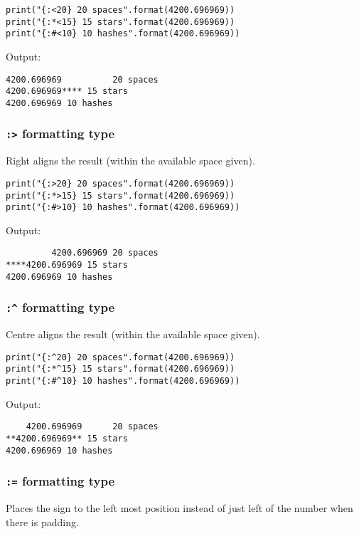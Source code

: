 \documentclass[11pt]{article}
\begin{document}
\begin{verbatim}
print("{:<20} 20 spaces".format(4200.696969))
print("{:*<15} 15 stars".format(4200.696969))
print("{:#<10} 10 hashes".format(4200.696969))
\end{verbatim}

 \noindent Output:

\begin{verbatim}
4200.696969          20 spaces
4200.696969**** 15 stars
4200.696969 10 hashes
\end{verbatim}


\subsubsection{\texttt{:>} formatting type}
\label{sec:org729ab52}
Right aligns the result (within the available space given).

\begin{verbatim}
print("{:>20} 20 spaces".format(4200.696969))
print("{:*>15} 15 stars".format(4200.696969))
print("{:#>10} 10 hashes".format(4200.696969))
\end{verbatim}

 \noindent Output:

\begin{verbatim}
         4200.696969 20 spaces
****4200.696969 15 stars
4200.696969 10 hashes
\end{verbatim}

\subsubsection{\texttt{:\textasciicircum{}} formatting type}
\label{sec:org1d89a05}
Centre aligns the result (within the available space given).

\begin{verbatim}
print("{:^20} 20 spaces".format(4200.696969))
print("{:*^15} 15 stars".format(4200.696969))
print("{:#^10} 10 hashes".format(4200.696969))
\end{verbatim}

 \noindent Output:

\begin{verbatim}
    4200.696969      20 spaces
**4200.696969** 15 stars
4200.696969 10 hashes
\end{verbatim}

\subsubsection{\texttt{:=} formatting type}
\label{sec:orgd775ea4}
Places the sign to the left most position instead of just left of the number when there is padding.
\end{document}
